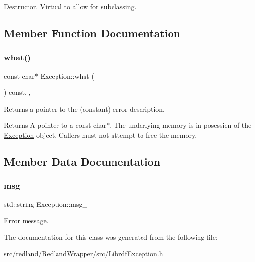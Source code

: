 Destructor. Virtual to allow for subclassing. 

\subsection{Member Function Documentation}
\mbox{\label{classException_ae7ba8334eb35e001b4b0c6df9339c0dc}} 
\subsubsection{\texorpdfstring{what()}{what()}}
{\footnotesize\ttfamily const char$\ast$ Exception\+::what (\begin{DoxyParamCaption}{ }\end{DoxyParamCaption}) const\hspace{0.3cm}{\ttfamily [inline]}, {\ttfamily [override]}, {\ttfamily [noexcept]}}

Returns a pointer to the (constant) error description. \begin{DoxyReturn}{Returns}
A pointer to a const char$\ast$. The underlying memory is in posession of the \hyperlink{classException}{Exception} object. Callers must not attempt to free the memory. 
\end{DoxyReturn}


\subsection{Member Data Documentation}
\mbox{\label{classException_a5d59cc46086c61391ed26773ce861780}} 
\subsubsection{\texorpdfstring{msg\+\_\+}{msg\_}}
{\footnotesize\ttfamily std\+::string Exception\+::msg\+\_\+\hspace{0.3cm}{\ttfamily [protected]}}

Error message. 

The documentation for this class was generated from the following file\+:\begin{DoxyCompactItemize}
\item 
src/redland/\+Redland\+Wrapper/src/Librdf\+Exception.\+h\end{DoxyCompactItemize}
